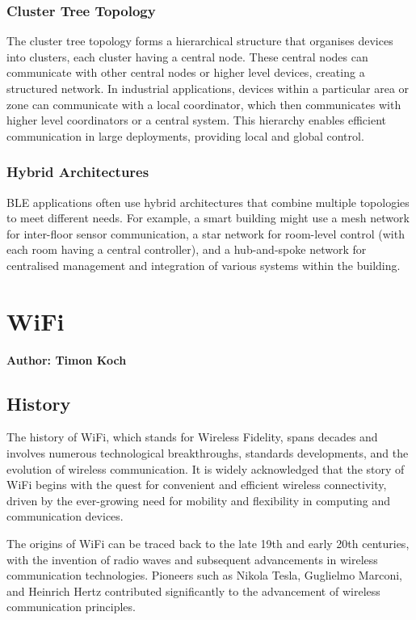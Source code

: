 \subsubsection{Cluster Tree Topology}
The cluster tree topology forms a hierarchical structure that organises devices into clusters, each cluster having a central node. These central nodes can communicate with other central nodes or higher level devices, creating a structured network. In industrial applications, devices within a particular area or zone can communicate with a local coordinator, which then communicates with higher level coordinators or a central system. This hierarchy enables efficient communication in large deployments, providing local and global control.

\subsubsection{Hybrid Architectures}
BLE applications often use hybrid architectures that combine multiple topologies to meet different needs. For example, a smart building might use a mesh network for inter-floor sensor communication, a star network for room-level control (with each room having a central controller), and a hub-and-spoke network for centralised management and integration of various systems within the building.

\section{WiFi}
\textbf{Author: Timon Koch}

\subsection{History}
The history of WiFi, which stands for Wireless Fidelity, spans decades and involves numerous technological breakthroughs, standards developments, and the evolution of wireless communication. It is widely acknowledged that the story of WiFi begins with the quest for convenient and efficient wireless connectivity, driven by the ever-growing need for mobility and flexibility in computing and communication devices.

The origins of WiFi can be traced back to the late 19th and early 20th centuries, with the invention of radio waves and subsequent advancements in wireless communication technologies. Pioneers such as Nikola Tesla, Guglielmo Marconi, and Heinrich Hertz contributed significantly to the advancement of wireless communication principles.

